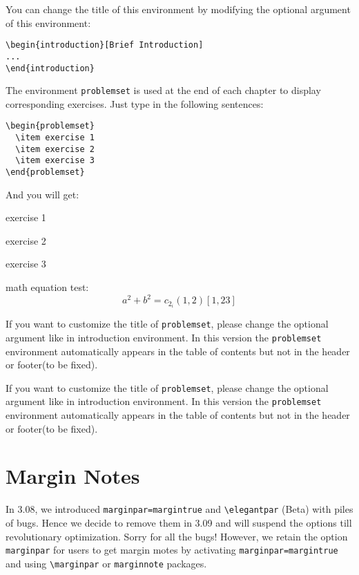 \documentclass[11pt]{elegantbook}
\begin{document}
You can change the title of this environment by modifying the optional argument of this environment:
\begin{lstlisting}
\begin{introduction}[Brief Introduction]
...
\end{introduction}
\end{lstlisting}

The environment \lstinline{problemset} is used at the end of each chapter to display corresponding exercises. Just type in the following sentences:
\begin{lstlisting}
\begin{problemset}
  \item exercise 1
  \item exercise 2
  \item exercise 3
\end{problemset}
\end{lstlisting}
And you will get:
\begin{problemset}
  \item exercise 1
  \item exercise 2
  \item exercise 3
  \item math equation test:
  \begin{equation}
  a^2+b^2=c_{2_{i}} (1,2) [1,23]
  \end{equation}
\end{problemset}
\begin{remark}
If you want to customize the title of \lstinline{problemset}, please change the optional argument like in introduction environment. In this version the \lstinline{problemset} environment automatically appears in the table of contents but not in the header or footer(to be fixed).
\end{remark}

\begin{solution}
  If you want to customize the title of \lstinline{problemset}, please change the optional argument like in introduction environment. In this version the \lstinline{problemset} environment automatically appears in the table of contents but not in the header or footer(to be fixed).
\end{solution}

\section{Margin Notes}
In 3.08, we introduced \lstinline{marginpar=margintrue} and \lstinline{\elegantpar} (Beta) with piles of bugs. Hence we decide to remove them in 3.09 and will suspend the options till revolutionary optimization. Sorry for all the bugs! However, we retain the option \lstinline{marginpar} for users to get margin motes by activating \lstinline{marginpar=margintrue} and using \lstinline{\marginpar} or \lstinline{marginnote} packages.
\end{document}
